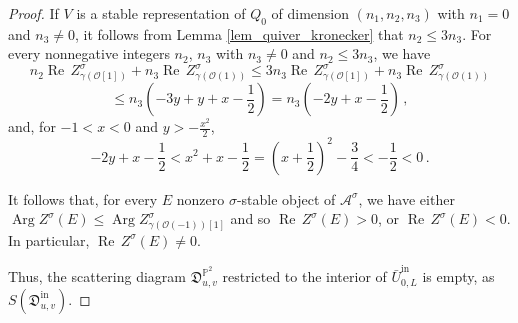 \documentclass[12pt, a4paper]{amsart}
\newcommand\PP{\mathbb P}
\newcommand\cA{\mathcal A}
\newcommand\cO{\mathcal O}
\newcommand\fD{\mathfrak D}
\newcommand\Arg{\operatorname{Arg}}
\newcommand\Rea{\operatorname{Re}\,}
\newcommand\iin{\mathrm{in}}
\begin{document}
\begin{proof}
If $V$ is a stable representation of $Q_0$ of dimension 
$(n_1,n_2,n_3)$ with $n_1=0$ and 
$n_3 \neq 0$, it follows from 
Lemma \ref{lem_quiver_kronecker} that 
$n_2 \leqslant 3n_3$.
For every nonnegative integers $n_2$, $n_3$
with $n_3 \neq 0$ and $n_2 \leqslant 3n_3$, we have 
\[ n_2 \Rea Z^\sigma_{\gamma(\cO[1])}
+n_3 \Rea Z^\sigma_{\gamma(\cO(1))}
\leqslant 3n_3 \Rea Z^\sigma_{\gamma(\cO[1])}
+n_3 \Rea Z^\sigma_{\gamma(\cO(1))} \]
\[ \leqslant n_3(-3y+y+x-\frac{1}{2})
=n_3(-2y+x-\frac{1}{2})\,,\]
and, for $-1<x<0$ and $y >-\frac{x^2}{2}$, 
\[ -2y+x-\frac{1}{2}<x^2+x-\frac{1}{2}
=(x+\frac{1}{2})^2-\frac{3}{4}<-\frac{1}{2}<0\,.\]

It follows that, for every $E$ nonzero $\sigma$-stable object of $\cA^\sigma$, we have either $\Arg Z^\sigma(E) \leqslant 
\Arg Z^{\sigma}_{\gamma(\cO(-1))[1]}$ and so $\Rea Z^\sigma(E)>0$, or $\Rea Z^\sigma(E)<0$. In particular, 
$\Rea Z^\sigma(E) \neq 0$.

Thus, the scattering diagram $\fD_{u,v}^{\PP^2}$ restricted to the interior of 
$\bar{U}^\iin_{0,L}$ is empty, as 
$S(\fD^\iin_{u,v})$.



\end{proof}
\end{document}
